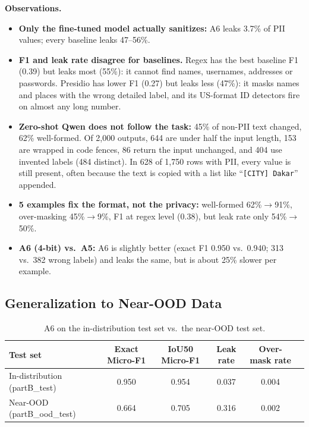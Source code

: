 \documentclass[10pt]{article}
\begin{document}
\textbf{Observations.}
\begin{itemize}
  \item \textbf{Only the fine-tuned model actually sanitizes:} A6 leaks 3.7\% of PII values; every baseline leaks 47--56\%.
  \item \textbf{F1 and leak rate disagree for baselines.} Regex has the best baseline F1 (0.39) but leaks most (55\%): it cannot find names, usernames, addresses or passwords. Presidio has lower F1 (0.27) but leaks less (47\%): it masks names and places with the wrong detailed label, and its US-format ID detectors fire on almost any long number.
  \item \textbf{Zero-shot Qwen does not follow the task:} 45\% of non-PII text changed, 62\% well-formed. Of 2{,}000 outputs, 644 are under half the input length, 153 are wrapped in code fences, 86 return the input unchanged, and 404 use invented labels (484 distinct). In 628 of 1{,}750 rows with PII, every value is still present, often because the text is copied with a list like ``\texttt{[CITY] Dakar}'' appended.
  \item \textbf{5 examples fix the format, not the privacy:} well-formed 62\%$\to$91\%, over-masking 45\%$\to$9\%, F1 at regex level (0.38), but leak rate only 54\%$\to$50\%.
  \item \textbf{A6 (4-bit) vs.\ A5:} A6 is slightly better (exact F1 0.950 vs.\ 0.940; 313 vs.\ 382 wrong labels) and leaks the same, but is about 25\% slower per example.
\end{itemize}

\subsection{Generalization to Near-OOD Data}

\begin{table}[H]
\centering
\caption{A6 on the in-distribution test set vs.\ the near-OOD test set.}
\label{tab:partB-ood}
\begin{tabular}{@{}l c c c c c@{}}
\toprule
Test set & Exact Micro-F1 & IoU50 Micro-F1 & Leak rate & Over-mask rate \\
\midrule
In-distribution (partB\_test)   & 0.950 & 0.954 & 0.037 & 0.004 \\
Near-OOD (partB\_ood\_test)     & 0.664 & 0.705 & 0.316 & 0.002 \\
\bottomrule
\end{tabular}
\end{table}
\end{document}
